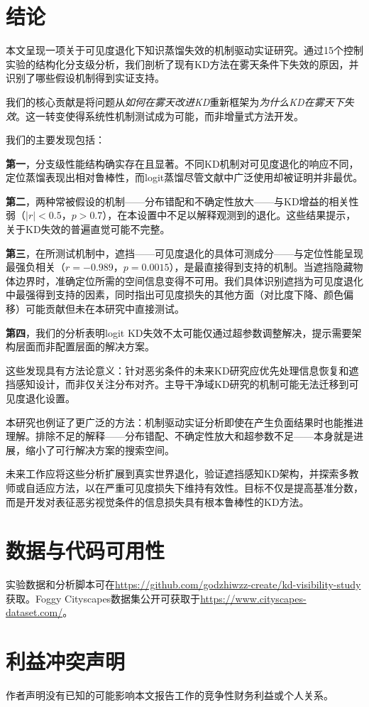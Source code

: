 \section{结论}
\label{sec:conclusion}

本文呈现一项关于可见度退化下知识蒸馏失效的机制驱动实证研究。通过15个控制实验的结构化分支级分析，我们剖析了现有KD方法在雾天条件下失效的原因，并识别了哪些假设机制得到实证支持。

我们的核心贡献是将问题从\emph{如何在雾天改进KD}重新框架为\emph{为什么KD在雾天下失效}。这一转变使得系统性机制测试成为可能，而非增量式方法开发。

我们的主要发现包括：

\textbf{第一}，分支级性能结构确实存在且显著。不同KD机制对可见度退化的响应不同，定位蒸馏表现出相对鲁棒性，而logit蒸馏尽管文献中广泛使用却被证明并非最优。

\textbf{第二}，两种常被假设的机制——分布错配和不确定性放大——与KD增益的相关性弱（$|r|<0.5$，$p>0.7$），在本设置中不足以解释观测到的退化。这些结果提示，关于KD失效的普遍直觉可能不完整。

\textbf{第三}，在所测试机制中，遮挡——可见度退化的具体可测成分——与定位性能呈现最强负相关（$r=-0.989$，$p=0.0015$），是最直接得到支持的机制。当遮挡隐藏物体边界时，准确定位所需的空间信息变得不可用。我们具体识别遮挡为可见度退化中最强得到支持的因素，同时指出可见度损失的其他方面（对比度下降、颜色偏移）可能贡献但未在本研究中直接测试。

\textbf{第四}，我们的分析表明logit KD失效不太可能仅通过超参数调整解决，提示需要架构层面而非配置层面的解决方案。

这些发现具有方法论意义：针对恶劣条件的未来KD研究应优先处理信息恢复和遮挡感知设计，而非仅关注分布对齐。主导干净域KD研究的机制可能无法迁移到可见度退化设置。

本研究也例证了更广泛的方法：机制驱动实证分析即使在产生负面结果时也能推进理解。排除不足的解释——分布错配、不确定性放大和超参数不足——本身就是进展，缩小了可行解决方案的搜索空间。

未来工作应将这些分析扩展到真实世界退化，验证遮挡感知KD架构，并探索多教师或自适应方法，以在严重可见度损失下维持有效性。目标不仅是提高基准分数，而是开发对表征恶劣视觉条件的信息损失具有根本鲁棒性的KD方法。

\section*{数据与代码可用性}

实验数据和分析脚本可在\url{https://github.com/godzhiwzz-create/kd-visibility-study}获取。Foggy Cityscapes数据集公开可获取于\url{https://www.cityscapes-dataset.com/}。

\section*{利益冲突声明}

作者声明没有已知的可能影响本文报告工作的竞争性财务利益或个人关系。
